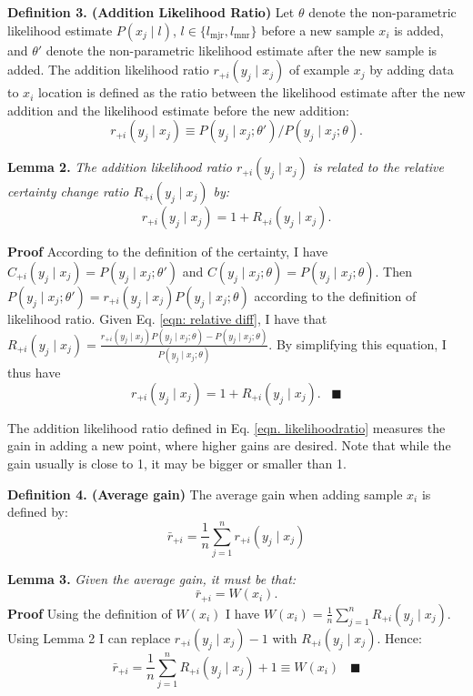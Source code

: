 \documentclass{iitthesis}
\begin{document}
\noindent\textbf{Definition 3. (Addition Likelihood Ratio)} Let $\theta$ denote the non-parametric likelihood estimate $P(x_j\mid l)$, $l\in \{l_{\mbox{mjr}}, l_{\mbox{mnr}}\}$ before a new sample $x_i$ is added, and $\theta'$ denote the non-parametric likelihood estimate after the new sample is added. The addition likelihood ratio $r_{+i}(y_j\mid x_j)$ of example $x_j$ by adding data to $x_i$ location is defined as the ratio between the likelihood estimate after the new addition and the likelihood estimate before the new addition: 
\begin{equation}
r_{+i}(y_j\mid x_j) \equiv P(y_j\mid x_j ; \theta') / P(y_j\mid x_j; \theta).
\label{eqn. likelihoodratio}
\end{equation}

\noindent \textbf{Lemma 2.} \textit{The addition likelihood ratio $r_{+i}(y_j\mid x_j)$ is related to the relative certainty change ratio $R_{+i}(y_j\mid x_j)$ by: }
\begin{equation}
r_{+i}(y_j\mid x_j)=1+R_{+i}(y_j\mid x_j).
\end{equation}

\noindent\textbf{Proof} According to the definition of the certainty, I have $C_{+i}(y_j\mid x_j)=P(y_j\mid x_j; \theta')$ and $C(y_j\mid x_j; \theta)=P(y_j\mid x_j; \theta)$. Then $P(y_j\mid x_j; \theta')=r_{+i}(y_j\mid x_j) P(y_j\mid x_j; \theta)$ according to the definition of likelihood ratio. Given Eq. \ref{eqn: relative diff}, I have that $R_{+i}(y_j\mid x_j)=\frac{r_{+i}(y_j\mid x_j) P(y_j \mid x_j; \theta) - P(y_j \mid x_j; \theta)}{P(y_j \mid x_j; \theta)}$.  By simplifying this equation, I thus have 
\begin{equation}
r_{+i}(y_j\mid x_j)=1+R_{+i}(y_j\mid x_j). \;\;\;\blacksquare
\end{equation}

The addition likelihood ratio defined in Eq. \ref{eqn. likelihoodratio} measures the gain in adding a new point, where higher gains are desired. Note that while the gain usually is close to 1, it may be bigger or smaller than 1.

\noindent\textbf{Definition 4. (Average gain)} The average gain when adding sample $x_i$ is defined by:
\begin{equation}
\bar{r}_{+i}=\frac{1}{n} \sum_{j=1}^n r_{+i}(y_j\mid x_j)
\end{equation}

\noindent\textbf{Lemma 3.} \textit{Given the average gain, it must be that:}
\begin{equation}
\bar{r}_{+i}=W(x_i).
\end{equation}
\noindent\textbf{Proof} Using the definition of $W(x_i)$ I have $W(x_i)=\frac{1}{n}\sum_{j=1}^n R_{+i}(y_j\mid x_j)$. Using Lemma 2 I can replace $r_{+i}(y_j \mid x_j)-1$ with $R_{+i}(y_j \mid x_j)$. Hence:
\begin{equation}
\bar{r}_{+i}=\frac{1}{n}\sum_{j=1}^n R_{+i}(y_j \mid x_j) + 1\equiv W(x_i) \;\;\;\blacksquare
\end{equation}
\end{document}
